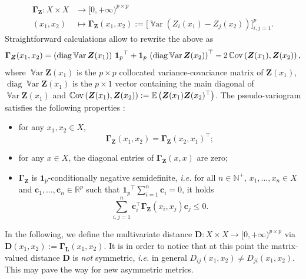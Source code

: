 \documentclass[12pt]{article}
\theoremstyle{plain}
\theoremstyle{remark}
\newcommand{\round}[1]{\left( #1 \right)}
\newcommand{\Exp}[1]{\mathbb{E}\round{#1}}
\newcommand{\Cov}[2]{\mathbb{C}{\rm ov}\round{#1,#2}}
\newcommand{\R}[0]{\mathbb{R}}
\newcommand{\onep}[0]{{\mathbf{1}_{p}}}
\newcommand{\ie}{\textit{i.e. }}
\newcommand{\dVec}[1]{{\bm{#1}}}            %
\newcommand{\latMatr}[1]{\mathbf{#1}}          %
\newcommand{\grMatr}[1]{{\boldsymbol{#1}}}   %
\newcommand{\rVec}[1]{{\bm{#1}}}            %
\newcommand{\tobi}[1]{\textcolor{teal}{#1}}
\DeclareMathOperator{\diag}{diag}
\DeclareMathOperator{\Var}{\mathbb{V}ar}
\begin{document}
    \begin{align}
        \label{eq:pseudoVariogramDef}
        \grMatr \Gamma_{\rVec{Z}}:X\times X &\to {[0,+\infty)}^{p\times p}\nonumber \\
        (x_1,x_2) &\mapsto \grMatr \Gamma_{\rVec{Z}}(x_1,x_2):=\Big [ \Var\round{Z_i(x_1)-Z_j(x_2)} \Big ]_{i,j=1}^p. 
    \end{align} 
    Straightforward calculations allow to rewrite the above as
    \begin{equation}
        \label{eq:pseudoVariogramMatricial}
        \grMatr \Gamma_{\boldsymbol{Z}}(x_1,x_2) = \round{\diag \Var \boldsymbol{Z}(x_1)} \,\onep^\top + \onep\, \round{\diag \Var \boldsymbol{Z}(x_2)}^\top - 2\, \Cov{\boldsymbol{Z}(x_1)}{\boldsymbol{Z}(x_2)},
    \end{equation}
    where $\Var \boldsymbol{Z}(x_1)$ is the $p\times p$  {collocated} variance-covariance matrix of $\boldsymbol{Z}(x_1)$, $\diag \Var \boldsymbol{Z}(x_1)$ is the $p\times 1$ vector containing the main diagonal of $\Var \boldsymbol{Z}(x_1)$ and $\Cov{\boldsymbol{Z}(x_1)}{\boldsymbol{Z}(x_2)}:=\Exp{\boldsymbol{Z}(x_1)\boldsymbol{Z}(x_2)^\top}$.
    The pseudo-variogram satisfies the following properties \citep{dorr2023characterization}:
    \begin{itemize}
        \item {for any $x_1,x_2 \in X$,} 
        \begin{equation}
            \label{sympseudo}
            \grMatr \Gamma_{{\rVec{Z}}}(x_1,x_2)=\grMatr \Gamma_{{\rVec{Z}}}(x_2,x_1)^\top;
        \end{equation}
        \item {for any $x \in X$, the diagonal entries of $\grMatr \Gamma_{{\rVec{Z}}}(x,x)$ are zero;}
        \item $\grMatr \Gamma_{{\rVec{Z}}}$ is $\onep$-conditionally negative semidefinite, \ie for all {$n \in \mathbb{N}^+$, $x_1,\dots,x_n\in X$ and } $\dVec c_1,\dots,\dVec c_n\in\R^p$ such that $ {\onep}^\top \sum_{i=1}^n \dVec c_i = 0$, it holds
        \begin{equation}
            \label{eq:negativesemidef}
            \sum_{i,j=1}^n \dVec c_i^\top \grMatr \Gamma_{{\rVec{Z}}}(x_i,x_j) \dVec c_j \leq 0.
        \end{equation}
    \end{itemize}
    
    In the following, we define %
    the multivariate distance $\latMatr D:X\times X \to {[0,+\infty)}^{p\times p}$ via $\latMatr D(x_1,x_2):=\grMatr{\Gamma}_{\latMatr L}(x_1,x_2)$. It is in order to notice that at this point the matrix-valued distance $\latMatr D$ is \emph{not} symmetric, \ie in general $D_{ij}(x_1,x_2)\ne D_{ji}(x_1,x_2)$. This may pave the way for new asymmetric metrics. %
\end{document}
